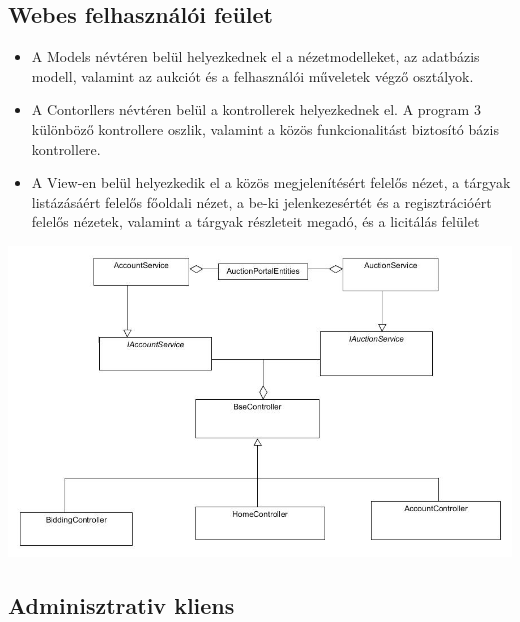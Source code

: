 \documentclass[12pt,a4paper]{article}
\begin{document}
\subsection{Webes felhasználói feület}
\begin{itemize}
\item A Models névtéren belül helyezkednek el a nézetmodelleket, az adatbázis modell, valamint az aukciót és a felhasználói műveletek végző osztályok.
\item A Contorllers névtéren belül a kontrollerek helyezkednek el. A program 3 különböző kontrollere oszlik, valamint a közös funkcionalitást biztosító bázis kontrollere.
\item A View-en belül helyezkedik el a közös megjelenítésért felelős nézet, a tárgyak listázásáért felelős főoldali nézet,  a be-ki jelenkezesértét és a regisztrációért felelős nézetek, valamint a tárgyak részleteit megadó, és a licitálás felület
\end{itemize}
\includegraphics[scale=0.5]{osztaly_szerkezet.jpg}

\subsection{Adminisztrativ kliens}
\begin{itemize}

\end{itemize}
\end{document}
